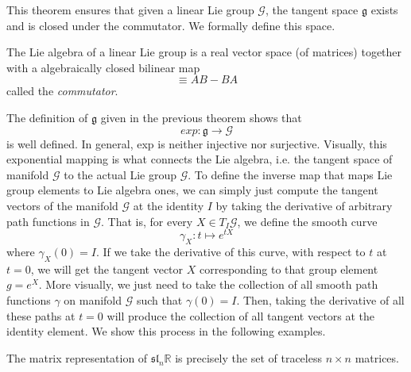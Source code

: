 \documentclass{article}
\begin{document}
    This theorem ensures that given a linear Lie group $\mathcal{G}$, the tangent space $\mathfrak{g}$ exists and is closed under the commutator. We formally define this space. 

    \begin{definition}
      The Lie algebra of a linear Lie group is a real vector space (of matrices) together with a algebraically closed bilinear map 
      \begin{equation}
        [A,B] \equiv A B - B A
      \end{equation}
      called the \textit{commutator}. 
    \end{definition} 

    The definition of $\mathfrak{g}$ given in the previous theorem shows that 
    \begin{equation}
      exp: \mathfrak{g} \longrightarrow \mathcal{G}
    \end{equation}
    is well defined. In general, exp is neither injective nor surjective. Visually, this exponential mapping is what connects the Lie algebra, i.e. the tangent space of manifold $\mathcal{G}$ to the actual Lie group $\mathcal{G}$. To define the inverse map that maps Lie group elements to Lie algebra ones, we can simply just compute the tangent vectors of the manifold $\mathcal{G}$ at the identity $I$ by taking the derivative of arbitrary path functions in $\mathcal{G}$. That is, for every $X \in T_I \mathcal{G}$, we define the smooth curve 
    \begin{equation}
      \gamma_X: t \mapsto e^{tX}
    \end{equation}
    where $\gamma_X(0) = I$. If we take the derivative of this curve, with respect to $t$ at $t = 0$, we will get the tangent vector $X$ corresponding to that group element $g = e^{X}$. More visually, we just need to take the collection of all smooth path functions $\gamma$ on manifold $\mathcal{G}$ such that $\gamma(0) = I$. Then, taking the derivative of all these paths at $t = 0$ will produce the collection of all tangent vectors at the identity element. We show this process in the following examples. 

    \begin{theorem}
      The matrix representation of $\mathfrak{sl}_n \mathbb{R}$ is precisely the set of traceless $n \times n$ matrices. 
    \end{theorem}
\end{document}
